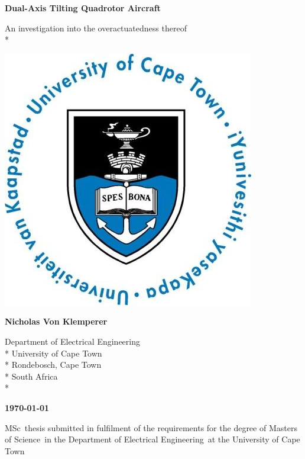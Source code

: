 \documentclass[a4paper, 11pt, oneside, openright, parskip=full]{book}
\newcommand{\auth}{Nicholas Von Klemperer}								%
\newcommand{\titl}{Dual-Axis Tilting Quadrotor Aircraft}						%
\newcommand{\subtitle}{An investigation into the overactuatedness thereof}						%
\newcommand{\dept}{Department of Electrical Engineering}%
\newcommand{\uni}{University of Cape Town}				%
\newcommand{\city}{Rondebosch, Cape Town}				%
\newcommand{\country}{South Africa}						%
\newcommand{\degre}{Masters of Science}				%
\newcommand{\degreeabv}{MSc}							%
\newcommand{\supervisor}{Supervisor}					%
\newcommand{\logo}										%
{	
	\includegraphics[scale = 0.3]{figs/uctLogo}
}
\begin{document}
\begin{titlepage}
	\centering
	\vspace*{1cm}

	\begin{Huge}					
		\bfseries\titl\par
		\vskip 5mm
	\end{Huge}
	\begin{Large}					
		\subtitle\\*
		\vskip 3cm
	\end{Large}
	\logo							
	\vskip 1.5cm	
	\begin{Large}					
		\bfseries\auth\\
	\end{Large}
	\begin{normalsize}				
		\vskip 2mm	
		\dept\\*
		\uni\\*
		\city\\*
		\country\\*
		
		\vskip 15mm	
	\end{normalsize}
	\begin{Large}					
		{\bfseries \mydate\today}
		\vskip 15mm	
	\end{Large}
		\degreeabv\ thesis submitted in fulfilment of the requirements for the degree of \degre\ in the \dept\ at the \uni
		

\end{titlepage}
\end{document}
